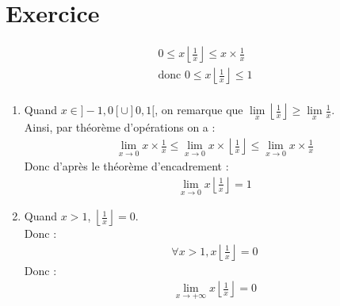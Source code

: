 \documentclass{report}
\begin{document}
\setcounter{chapter}{15}
\setcounter{section}{1}
\section{Exercice}
\begin{align*}
    0 \leq x \left\lfloor \frac{1}{x} \right\rfloor \leq x \times \frac{1}{x} \\
    \text{donc } 0 \leq x \left\lfloor \frac{1}{x} \right\rfloor \leq 1 \\
\end{align*}
\begin{enumerate}
    \item Quand $x \in ]-1, 0[ \cup ]0, 1[$, on remarque que $\lim\limits_x \left\lfloor \frac{1}{x} \right\rfloor \geq \lim\limits_x \frac{1}{x}$. \\
    Ainsi, par théorème d'opérations on a :
    \begin{align*}
        \lim_{x\to 0} x \times \frac{1}{x} \leq \lim_{x\to 0} x \times \left\lfloor \frac{1}{x} \right\rfloor \leq \lim_{x\to 0} x \times \frac{1}{x}
    \end{align*}
    Donc d'après le théorème d'encadrement : 
    \begin{align*}
        \boxed{\lim_{x\to 0} x \left\lfloor \frac{1}{x} \right\rfloor = 1}
    \end{align*}

    \item Quand $x > 1$, $\left\lfloor \frac{1}{x} \right\rfloor = 0$. \\
    Donc : 
    \begin{align*}
        \forall x > 1, x \left\lfloor \frac{1}{x} \right\rfloor = 0
    \end{align*}
    Donc : 
    \begin{align*}
        \boxed{\lim_{x\to +\infty} x \left\lfloor \frac{1}{x} \right\rfloor = 0} 
    \end{align*}
\end{enumerate}
\end{document}
